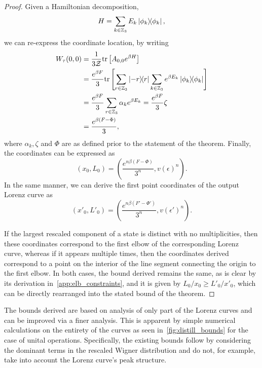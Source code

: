 \documentclass[pra,
aps,
twocolumn,
superscriptaddress,
groupedaddress,
nofootinbib,
reprint
]{revtex4-1}
\begin{document}
\begin{proof}
Given a Hamiltonian decomposition,
\begin{equation}
	H = \sum_{k \in \mathbb{Z}_3} E_k\ketbra{\phi_k}{\phi_k},
\end{equation}
we can re-express the coordinate location, by writing
\begin{align}
	W_{\tau}(0,0) &= \frac{1}{3\mathcal{Z}}\mbox{tr}\left[ A_{0,0}e^{\beta H} \right] \nonumber\\
	&= \frac{e^{\beta F}}{3} \mbox{tr}\left[ \sum_{r \in \mathbb{Z}_3} \ketbra{-r}{r}\sum_{k \in \mathbb{Z}_3} e^{\beta E_k}\ketbra{\phi_k}{\phi_k} \right] \\
	&= \frac{e^{\beta F}}{3} \sum_{r \in \mathbb{Z}_3} \alpha_k e^{\beta E_k}
	= \frac{e^{\beta F}}{3} \zeta \\
	&= \frac{e^{\beta (F - \Phi)}}{3},
\end{align}
where $\alpha_k, \zeta$ and $\Phi$ are as defined prior to the statement of the theorem.
Finally, the coordinates can be expressed as
\begin{equation}
	(x_0, L_0) = \left( \frac{e^{n\beta (F - \Phi)}}{3^n}, v(\epsilon)^n \right).
\end{equation}
In the same manner, we can derive the first point coordinates of the output Lorenz curve as
\begin{equation}
	(x'_0, L'_0) = \left( \frac{e^{n\beta (F' - \Phi')}}{3^n}, v(\epsilon')^n \right).
\end{equation}

If the largest rescaled component of a state is distinct with no multiplicities, then these coordinates correspond to the first elbow of the corresponding Lorenz curve, whereas if it appears multiple times, then the coordinates derived correspond to a point on the interior of the line segment connecting the origin to the first elbow.
In both cases, the bound derived remains the same, as is clear by its derivation in~\cref{app:elb_constraints}, and it is given by $L_0 / x_0 \geq L'_0 / x'_0$, which can be directly rearranged into the stated bound of the theorem.




\end{proof}

The bounds derived are based on analysis of only part of the Lorenz curves and can be improved via a finer analysis.
This is apparent by simple numerical calculations on the entirety of the curves as seen in~\cref{fig:distill_bounds} for the case of unital operations.
Specifically, the existing bounds follow by considering the dominant terms in the rescaled Wigner distribution and do not, for example, take into account the Lorenz curve's peak structure. 
\end{document}
